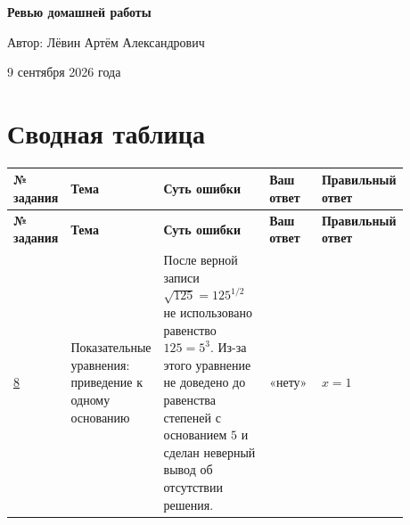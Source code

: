 \documentclass[12pt,a4paper]{article}
\begin{document}
\begin{titlepage}
\thispagestyle{empty}
\begin{center}
\vspace*{0.23\textheight}

{\LARGE\bfseries Ревью домашней работы\par}

\vspace{2.4cm}

{\large Автор: Лёвин Артём Александрович\par}

\vspace{0.8cm}

{\large 9 сентября 2026 года\par}

\vfill


\vspace{1.0cm}
\end{center}
\end{titlepage}

\newpage
\section*{Сводная таблица}

{\small
\begin{longtable}{@{}>{\centering\arraybackslash}p{0.08\linewidth}p{0.19\linewidth}p{0.31\linewidth}p{0.14\linewidth}p{0.16\linewidth}@{}}
\toprule
\textbf{№ задания} & \textbf{Тема} & \textbf{Суть ошибки} & \textbf{Ваш ответ} & \textbf{Правильный ответ} \\
\midrule
\endfirsthead
\toprule
\textbf{№ задания} & \textbf{Тема} & \textbf{Суть ошибки} & \textbf{Ваш ответ} & \textbf{Правильный ответ} \\
\midrule
\endhead
\bottomrule
\endfoot
\hyperref[task:8]{8} &
Показательные уравнения: приведение к одному основанию &
После верной записи $\sqrt{125}=125^{1/2}$ не использовано равенство $125=5^3$. Из-за этого уравнение не доведено до равенства степеней с основанием $5$ и сделан неверный вывод об отсутствии решения. &
«нету» &
$x=1$ \\
\end{longtable}
}
\end{document}
